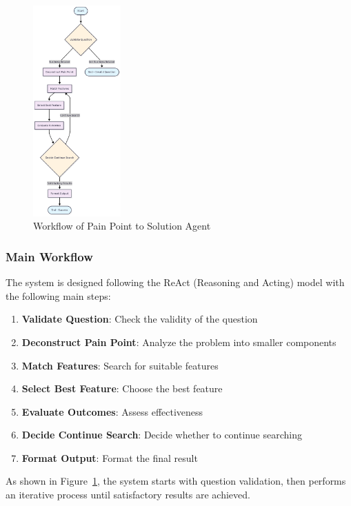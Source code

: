 \documentclass[12pt,a4paper]{article}
\begin{document}
\begin{figure}[h]
    \centering
    \includegraphics[width=0.3\textwidth]{Flow.png}
    \caption{Workflow of Pain Point to Solution Agent}
    \label{fig:workflow-en}
\end{figure}
\newpage
\subsubsection{Main Workflow}
The system is designed following the ReAct (Reasoning and Acting) model with the following main steps:

\begin{enumerate}[label=\textbf{\arabic*.}]
    \item \textbf{Validate Question}: Check the validity of the question
    \item \textbf{Deconstruct Pain Point}: Analyze the problem into smaller components
    \item \textbf{Match Features}: Search for suitable features
    \item \textbf{Select Best Feature}: Choose the best feature
    \item \textbf{Evaluate Outcomes}: Assess effectiveness
    \item \textbf{Decide Continue Search}: Decide whether to continue searching
    \item \textbf{Format Output}: Format the final result
\end{enumerate}

As shown in Figure~\ref{fig:workflow-en}, the system starts with question validation, then performs an iterative process until satisfactory results are achieved.
\end{document}
